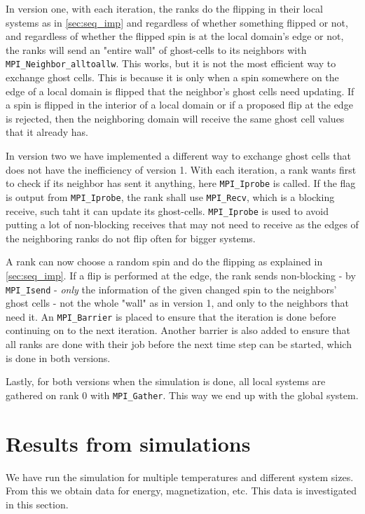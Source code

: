\documentclass{article}
\begin{document}
In version one, with each iteration, the ranks do the flipping in their local systems as in \ref{sec:seq_imp} and regardless of whether something flipped or not, and regardless of whether the flipped spin is at the local domain's edge or not, the ranks will send an "entire wall" of ghost-cells to its neighbors with \texttt{MPI\_Neighbor\_alltoallw}. This works, but it is not the most efficient way to exchange ghost cells. This is because it is only when a spin somewhere on the edge of a local domain is flipped that the neighbor's ghost cells need updating. If a spin is flipped in the interior of a local domain or if a proposed flip at the edge is rejected, then the neighboring domain will receive the same ghost cell values that it already has.

In version two we have implemented a different way to exchange ghost cells that does not have the inefficiency of version 1. With each iteration, a rank wants first to check if its neighbor has sent it anything, here \texttt{MPI\_Iprobe} is called. If the flag is output from \texttt{MPI\_Iprobe}, the rank shall use \texttt{MPI\_Recv}, which is a blocking receive, such taht it can update its ghost-cells. \texttt{MPI\_Iprobe} is used to avoid putting a lot of non-blocking receives that may not need to receive as the edges of the neighboring ranks do not flip often for bigger systems.

A rank can now choose a random spin and do the flipping as explained in \ref{sec:seq_imp}. If a flip is performed at the edge, the rank sends non-blocking - by \texttt{MPI\_Isend} - \textit{only} the information of the given changed spin to the  neighbors' ghost cells - not the whole "wall" as in version 1, and only to the neighbors that need it. An \texttt{MPI\_Barrier} is placed to ensure that the iteration is done before continuing on to the next iteration. Another barrier is also added to ensure that all ranks are done with their job before the next time step can be started, which is done in both versions.

Lastly, for both versions when the simulation is done, all local systems are gathered on rank 0 with \texttt{MPI\_Gather}. This way we end up with the global system.

\section{Results from simulations}
We have run the simulation for multiple temperatures and different system sizes. From this we obtain data for energy, magnetization, etc. This data is investigated in this section.
\end{document}
